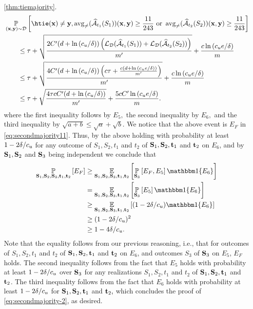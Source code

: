 \begin{proofof}{\cref{thm:tiemajority}.}
\begin{align*}
& \p_{(\rx,\ry)\sim\cD}\left[ \htie(\rx)\not=\ry,\avg(\widehat{\cA}_{t_{1}}(S_{1}))(\rx,\ry)\geq \frac{11}{243} \text{ or } \avg(\widehat{\cA}_{t_{2}}(S_{2}))(\rx,\ry)\geq \frac{11}{243}\right]
    \\
& \qquad \leq \tau+ \sqrt{\frac{2C'(d+\ln{\left(\cu/\delta \right)})\left(\ls_{\cD}(\widehat{\cA}_{t_{1}}(S_{1})) +\ls_{\cD}(\widehat{\cA}_{t_{2}}(S_{2}))\right)}{m'}}+\frac{c\ln{\left(\cu e/\delta \right)}}{m}
    \\
& \qquad \leq\tau+ \sqrt{\frac{4C'(d+\ln{\left(\cu/\delta \right)})\left(c\tau+\frac{c\left(d+\ln{(\cu e/\delta )}\right)}{m'}\right)}{m'}}+\frac{c\ln{\left(\cu e/\delta \right)}}{m}
    \\
& \qquad \leq
    \tau+ \sqrt{\frac{4\tau cC'(d+\ln{\left(\cu/\delta \right)})}{m'}}+\frac{5cC'\ln{\left(\cu e/\delta \right)}}{m}.
\end{align*}
where the first inequality follows by $ E_{5},$ the second inequality by $ E_{6},$ and the third inequality by $ \sqrt{a+b}\leq \sqrt{a}+\sqrt{b}.$ 
We notice that the above event is $ E_{F} $ in \cref{eq:secondmajority11}. 
Thus, by the above holding with probability at least $ 1-2\delta/c_{u} $ for any outcome of $ S_{1},S_{2},t_{1} $ and $ t_{2} $ of $ \mathbf{S}_{1},\mathbf{S}_{2},\mathbf{t}_{1} $ and $ \mathbf{t}_{2}$ on $ E_{6} $, and by $ \mathbf{S}_{1},\mathbf{S}_{2}$ and $\mathbf{S}_{3} $ being independent  we conclude that 
\begin{align*}
 \p_{\rS_{1},\rS_{2},\rS_{3},\rt_{1},\rt_{2}}\left[ E_{F}\right] 
 & \geq\e_{\rS_{1},\rS_{2},\rS_{3},\rt_{1},\rt_{2}}\left[ \p_{\rS_{3}}\left[E_{F},E_{5}\right]\ind\{  E_{6}\} \right] \\
 &=\e_{\rS_{1},\rS_{2},\rS_{3},\rt_{1},\rt_{2}}\left[ \p_{\rS_{3}}\left[E_{5}\right]\ind\{  E_{6}\} \right]
 \\
 &\geq\e_{\rS_{1},\rS_{2},\rS_{3},\rt_{1},\rt_{2}}\left[ (1-2\delta/\cu)\ind\{  E_{6}\} \right] \\
 & \geq (1-2\delta/\cu)^{2} \\ & \geq 1-4\delta/\cu. 
\end{align*} 
Note that the equality follows from our previous reasoning, i.e., that for outcomes of $ S_{1},S_{2},t_{1} $ and $ t_{2} $ of $ \mathbf{S}_{1},\mathbf{S}_{2},\mathbf{t}_{1} $ and $ \mathbf{t}_{2}$ on $ E_{6} $, and outcomes $ S_{3} $  of $ \mathbf{S}_{3} $ on $ E_{5} $, $ E_{F} $ holds. The second inequality follows from the fact that $E_{5}$ holds with probability at least $ 1-2\delta/c_{u} $ over $ \mathbf{S}_{3} $  for any realizations $ S_{1},S_{2},t_{1} $ and $ t_{2} $ of $ \mathbf{S}_{1},\mathbf{S}_{2},\mathbf{t}_{1} $ and $ \mathbf{t}_{2}$. The third inequality follows from the fact that $ E_{6} $ holds with probability at least $ 1-2\delta/c_{u} $ for $ \mathbf{S}_{1},\mathbf{S}_{2}, \mathbf{t}_{1} $ and $ \mathbf{t}_{2},$ which concludes the proof of \cref{eq:secondmajority-2}, as desired.      
\end{proofof}


